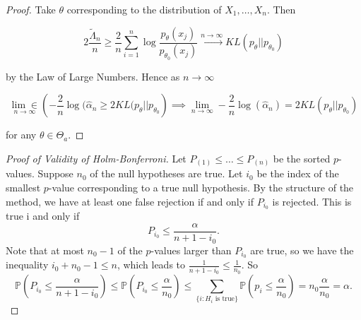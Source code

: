 \begin{proof}
Take \(\theta\) corresponding to the distribution of \(X_1, \ldots, X_n\). Then 

\[
 2 \frac{\tilde{\Lambda}_n}{n}  \geq \frac{2}{n} \sum_{i=1}^n \log \frac{p_\theta(x_j)}{p_{\theta_0}(x_j)} \xrightarrow{n \to \infty} KL(p_\theta || p_{\theta_0})
\]

by the Law of Large Numbers. Hence as \(n \to \infty\)

\[
\underset{n \to \infty}{\lim \in} \left(- \frac{2}{n} \log(\hat{\alpha}_n \geq 2 KL(p_\theta || p_{\theta_0} \right) \implies \lim_{n \to \infty} - \frac{2}{n} \log(\hat{\alpha}_n) = 2 KL(p_\theta || p_{\theta_0})
\]

for any \(\theta \in \Theta_a\).

\end{proof}


\begin{proof}[Proof of Validity of Holm-Bonferroni]

Let \(P_{(1)} \leq \ldots \leq P_{(n)}\) be the sorted \(p\)-values. Suppose \(n_0\) of the null hypotheses are true. Let \(i_0\) be the index of the smallest \(p\)-value corresponding to a true null hypothesis. By the structure of the method, we have at least one false rejection if and only if \(P_{i_0}\) is rejected. This is true i and only if
\[
P_{i_0} \leq \frac{\alpha}{n + 1 - i_0}.
\]
Note that at most \(n_0 - 1\) of the \(p\)-values larger than \(P_{i_0}\) are true, so we have the inequality \(i_0 + n_0 - 1 \leq n\), which leads to \(\frac{1}{n + 1 - i_0} \leq \frac{1}{n_0}\). So
\[
\mathbb{P} \left( P_{i_0} \leq \frac{\alpha}{n + 1 - i_0} \right) \leq  \mathbb{P} \left( P_{i_0} \leq \frac{\alpha}{n_0} \right) \leq \sum_{\{i: H_i \text{ is true}\}} \mathbb{P} \left( p_i \leq \frac{\alpha}{n_0} \right) = n_0 \frac{\alpha}{n_0} = \alpha.
\]

\end{proof}

